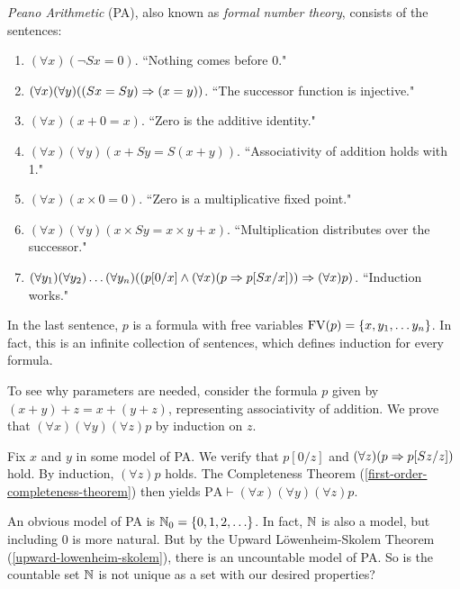 \documentclass{article}
\begin{document}
\begin{definition}
    \textit{Peano Arithmetic} (PA), also known as \textit{formal number theory}, consists of the sentences:
    \begin{enumerate}
	    \item $(\forall x)(\lnot Sx = 0)$. ``Nothing comes before 0."
	    \item $(\forall x)(\forall y)((Sx = Sy) \Rightarrow (x = y))$. ``The successor function is injective."
	    \item $(\forall x)(x + 0 = x)$. ``Zero is the additive identity."
	    \item $(\forall x)(\forall y)(x + Sy = S(x+y))$. ``Associativity of addition holds with 1."
	    \item $(\forall x)(x \times 0 = 0)$. ``Zero is a multiplicative fixed point."
	    \item $(\forall x)(\forall y)(x \times Sy = x\times y + x)$. ``Multiplication distributes over the successor."
	    \item $(\forall y_1)(\forall y_2) \dots (\forall y_n) ((p[0/x] \land (\forall x) (p \Rightarrow p[Sx/x])) \Rightarrow (\forall x) p)$. ``Induction works."
	\end{enumerate}
	In the last sentence, $p$ is a formula with free variables $\mathrm{FV}(p) = \left\lbrace x, y_1, \dots y_n \right\rbrace$. In fact, this is an infinite collection of sentences, which defines induction for every formula.
\end{definition}

\begin{example}[Induction]
    To see why parameters are needed, consider the formula $p$ given by $(x + y) + z = x + (y + z)$, representing associativity of addition. We prove that $(\forall x)(\forall y)(\forall z)p$ by induction on $z$.
    
    Fix $x$ and $y$ in some model of PA. We verify that $p[0/z]$ and $(\forall z)(p \Rightarrow p[Sz/z])$ hold. By induction, $(\forall z)p$ holds. The Completeness Theorem (\ref{first-order-completeness-theorem}) then yields $\mathrm{PA} \vdash (\forall x)(\forall y)(\forall z)p$.
\end{example}

An obvious model of PA is $\N_0 = \set{0, 1, 2, \dots}$. In fact, $\mathbb{N}$ is also a model, but including 0 is more natural.
But by the Upward L\"owenheim-Skolem Theorem (\ref{upward-lowenheim-skolem}), there is an uncountable model of PA. So is the countable set $\mathbb{N}$ is not unique as a set with our desired properties?
\end{document}
